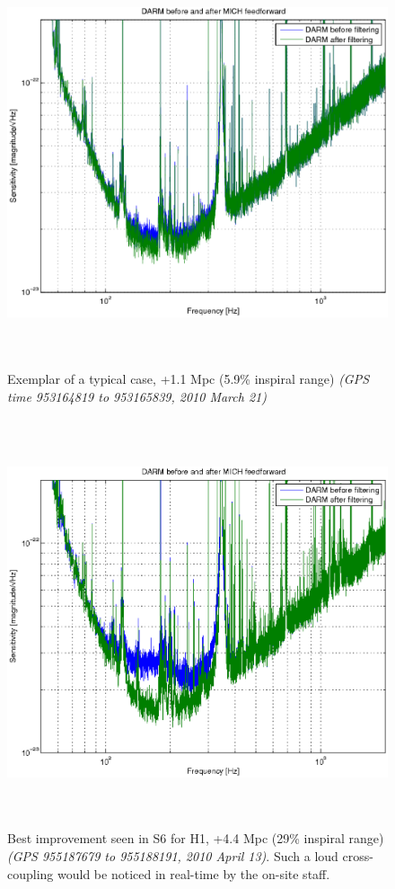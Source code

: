 \begin{figure}
\begin{center}
\includegraphics[height=120mm, width=150mm]{figure11.eps}
\caption{Exemplar of a typical case, +1.1 Mpc (5.9\% inspiral range)
\textit{(GPS time 953164819 to 953165839, 2010 March 21)}}
\label{typicalInspiralGraph}
\end{center}
\end{figure}
\begin{figure}
\begin{center}
\includegraphics[height=120mm, width=150mm]{figure12.eps}
\caption{Best improvement seen in S6 for H1, +4.4 Mpc (29\% inspiral range)
\textit{(GPS 955187679 to 955188191, 2010 April 13)}. Such a loud cross-coupling would be noticed in real-time by the on-site staff.}
\label{bestInspiralGraph}
\end{center}
\end{figure}

